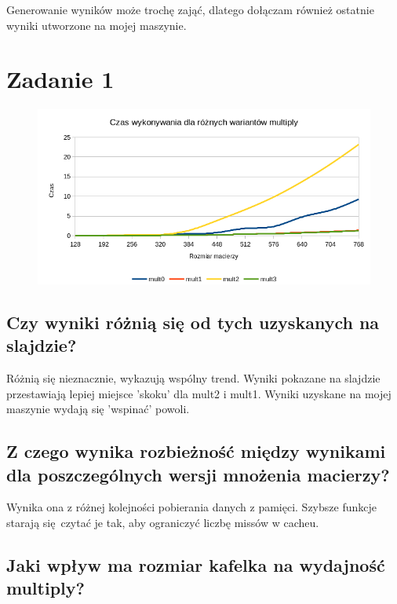 \documentclass[a4paper,12pt]{mwart} %
\begin{document}
Generowanie wyników może trochę zająć, dlatego dołączam również ostatnie wyniki utworzone na mojej maszynie.
\section*{Zadanie 1}

\begin{figure}[h!]
  \includegraphics[width=\linewidth]{graphs/graph1-1.png}
\end{figure}

\subsection*{Czy wyniki różnią się od tych uzyskanych na slajdzie?}

Różnią się nieznacznie, wykazują wspólny trend. Wyniki pokazane na slajdzie przestawiają lepiej miejsce 'skoku' dla mult2 i mult1.  Wyniki uzyskane na mojej maszynie wydają się 'wspinać' powoli.

\subsection*{Z czego wynika rozbieżność między wynikami dla poszczególnych wersji mnożenia macierzy?}

Wynika ona z różnej kolejności pobierania danych z pamięci. Szybsze funkcje starają się czytać je tak, aby ograniczyć liczbę missów w cacheu.


\subsection*{Jaki wpływ ma rozmiar kafelka na wydajność multiply?}
\end{document}
